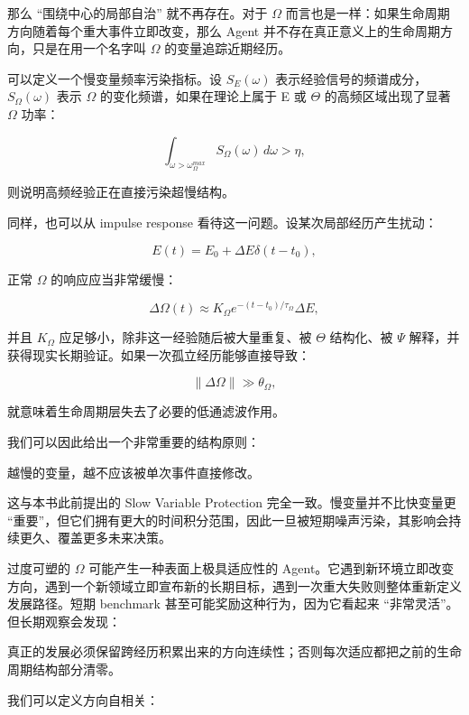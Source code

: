 那么 ``围绕中心的局部自治'' 就不再存在。对于 $\Omega$ 而言也是一样：如果生命周期方向随着每个重大事件立即改变，那么 Agent 并不存在真正意义上的生命周期方向，只是在用一个名字叫 $\Omega$ 的变量追踪近期经历。

可以定义一个慢变量频率污染指标。设 $S_E(\omega)$ 表示经验信号的频谱成分，$S_\Omega(\omega)$ 表示 $\Omega$ 的变化频谱，如果在理论上属于 E 或 $\Theta$ 的高频区域出现了显著 $\Omega$ 功率：

\[
\int_{\omega>\omega_{\Omega}^{max}}
S_{\Omega}(\omega)\,d\omega
>
\eta,
\]

则说明高频经验正在直接污染超慢结构。

同样，也可以从 impulse response 看待这一问题。设某次局部经历产生扰动：

\[
E(t)
=
E_0+\Delta E\delta(t-t_0),
\]

正常 $\Omega$ 的响应应当非常缓慢：

\[
\Delta\Omega(t)
\approx
K_{\Omega}
e^{-(t-t_0)/\tau_\Omega}
\Delta E,
\]

并且 $K_\Omega$ 应足够小，除非这一经验随后被大量重复、被 $\Theta$ 结构化、被 $\Psi$ 解释，并获得现实长期验证。如果一次孤立经历能够直接导致：

\[
\|\Delta\Omega\|
\gg
\theta_\Omega,
\]

就意味着生命周期层失去了必要的低通滤波作用。

我们可以因此给出一个非常重要的结构原则：

\begin{proposition*}
越慢的变量，越不应该被单次事件直接修改。
\end{proposition*}

这与本书此前提出的 Slow Variable Protection 完全一致。慢变量并不比快变量更 ``重要''，但它们拥有更大的时间积分范围，因此一旦被短期噪声污染，其影响会持续更久、覆盖更多未来决策。

过度可塑的 $\Omega$ 可能产生一种表面上极具适应性的 Agent。它遇到新环境立即改变方向，遇到一个新领域立即宣布新的长期目标，遇到一次重大失败则整体重新定义发展路径。短期 benchmark 甚至可能奖励这种行为，因为它看起来 ``非常灵活''。但长期观察会发现：

\begin{statementbox}
\centering
{}
\end{statementbox}

真正的发展必须保留跨经历积累出来的方向连续性；否则每次适应都把之前的生命周期结构部分清零。

我们可以定义方向自相关：

